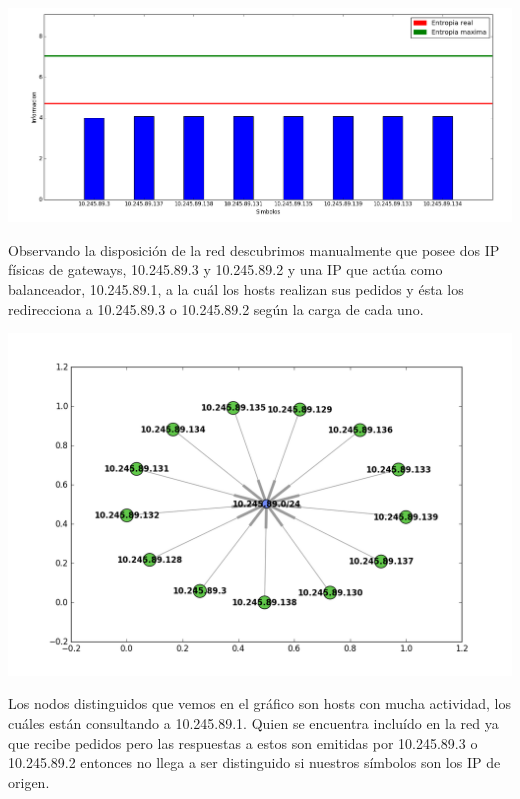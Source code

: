 \begin{center}
\includegraphics[scale=0.4]{imagenes/analisisTCORPcableada/fuenteS1-11.png} 
\end{center}

Observando la disposición de la red descubrimos manualmente que posee dos IP físicas de gateways, 10.245.89.3 y 10.245.89.2 y una IP que actúa como balanceador, 10.245.89.1, a la cuál los hosts realizan sus pedidos y ésta los redirecciona a 10.245.89.3 o 10.245.89.2 según la carga de cada uno.

\begin{center}
\includegraphics[scale=0.65]{imagenes/analisisTCORPcableada/cableada-11sum.png} 
\end{center}
\vspace*{-1cm}

Los nodos distinguidos que vemos en el gráfico son hosts con mucha actividad, los cuáles están consultando a 10.245.89.1. Quien se encuentra incluído en la red ya que recibe pedidos pero las respuestas a estos son emitidas por 10.245.89.3 o 10.245.89.2 entonces no llega a ser distinguido si nuestros símbolos son los IP de origen.


